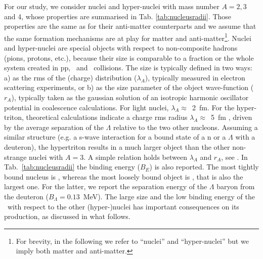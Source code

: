 \documentclass{appolb}
\begin{document}
For our study, we consider nuclei and hyper-nuclei with mass number $A = 2, 3$ and 4, whose properties are summarised in Tab. \ref{tab:nucleusradii}. Those properties are the same as for their anti-matter counterparts and we assume that the same formation mechanisms are at play for matter and anti-matter\footnote{For brevity, in the following we refer to ``nuclei'' and ``hyper-nuclei'' but we imply both matter and anti-matter.}.
Nuclei and hyper-nuclei are special objects with respect to non-composite hadrons (pions, protons, etc.), because their size is comparable to a fraction or the whole system created in pp, \pPb~and \PbPb~collisions.
The size is typically defined in two ways: a) as the rms of the (charge) distribution ($\lambda_A$), typically measured in electron scattering experiments, or b) as the size parameter of the object wave-function ($r_A$), typically taken as the gaussian solution of an isotropic harmonic oscillator potential in coalescence calculations. 
For light nuclei, $\lambda_A\approx$~2~fm.  For the hyper-triton, theoretical calculations indicate a charge rms radius $\lambda_A\approx$~5~fm \cite{Nemura:1999qp}, driven by the average separation of the $\Lambda$ relative to the two other nucleons. 
Assuming a similar structure (e.g. a s-wave interaction for a bound state of a n or a $\Lambda$ with a
deuteron), the hypertriton results in a much larger object than the other non-strange nuclei with $A=3$.
A simple relation holds between $\lambda_A$ and $r_A$, see \cite{Bellini:2018epz}. 
In Tab.~\ref{tab:nucleusradii} the binding energy ($B_E$) is also reported. The most tightly bound nucleus is \hefour, whereas the most loosely bound object is \hthreelambda, that is also the largest one. For the latter, we report the separation energy of the $\Lambda$ baryon from the deuteron ($B_\Lambda=0.13$~MeV). 
The large size and the low binding energy of the \hthreelambda~with respect to the other (hyper-)nuclei has important consequences on its production, as discussed in what follows.
\end{document}
